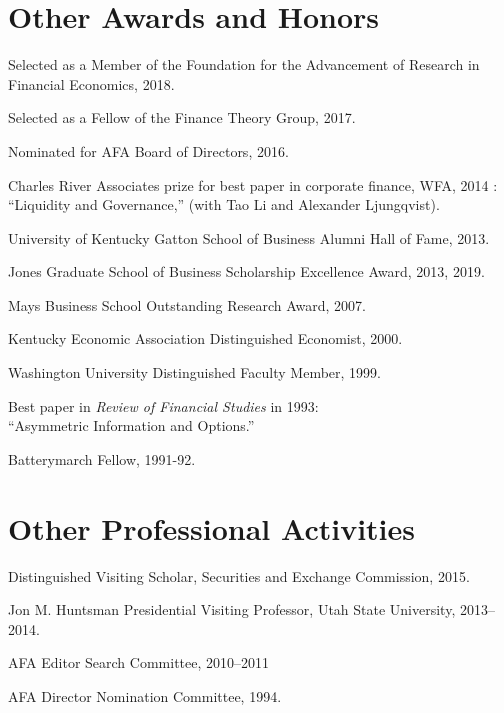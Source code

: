 \documentclass[margin, 11pt]{res}
\newenvironment{list1}{
  \begin{list}{}{%
            \setlength{\itemsep}{0in}
      \setlength{\parsep}{0in} \setlength{\parskip}{0in}
      \setlength{\topsep}{0in} \setlength{\partopsep}{0in}
      \setlength{\leftmargin}{0.2in}}}{\end{list}}
\begin{document}
\begin{resume}
\section{\sc Other Awards and Honors}
\begin{list1}
\item Selected as a Member of the Foundation for the Advancement of Research in \\ \hspace*{0.5cm} Financial Economics, 2018.
\item Selected as a Fellow of the Finance Theory Group, 2017.
\item Nominated for AFA Board of Directors, 2016.
\item Charles River Associates prize for best paper in corporate finance, WFA, 2014 :\\
\hspace*{0.5cm}``Liquidity and Governance,'' (with Tao Li and Alexander Ljungqvist).
\item University of Kentucky Gatton School of Business Alumni Hall of Fame, 2013.
\item Jones Graduate School of Business Scholarship Excellence Award, 2013, 2019.
\item Mays Business School Outstanding Research Award, 2007.
\item Kentucky Economic Association Distinguished Economist, 2000.
\item Washington University Distinguished Faculty Member, 1999.
\item Best paper in \textit{Review of Financial Studies} in 1993:\\
\hspace*{0.5cm} ``Asymmetric Information and Options.''
\item Batterymarch Fellow, 1991-92.
\end{list1}

\section{\sc Other Professional Activities}
\begin{list1}
\item Distinguished Visiting Scholar, Securities and Exchange Commission, 2015.
\item Jon M. Huntsman Presidential Visiting Professor, Utah State University, 2013--2014.
\item AFA Editor Search Committee, 2010--2011
\item AFA Director Nomination Committee, 1994.


\end{list1}



\end{resume}
\end{document}
